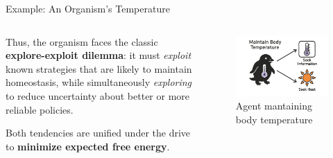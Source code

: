 \documentclass[aspectratio=1610, english]{beamer}
\begin{document}
\begin{frame}{Example: An Organism's Temperature}
    \begin{columns}[T]
        \begin{column}{0.5\textwidth}
            Thus, the organism faces the classic \textbf{explore-exploit dilemma}:  
            it must \emph{exploit} known strategies that are likely to maintain homeostasis, while simultaneously \emph{exploring} to reduce uncertainty about better or more reliable policies.
        
            \vspace{0.4cm}
        
            Both tendencies are unified under the drive to \textbf{minimize expected free energy}.
        \end{column}
        \begin{column}{0.5\textwidth}
            \begin{figure}
                \centering
                \includegraphics[width=1.0\linewidth]{img/active_inference_agent.png}
                \caption{Agent mantaining body temperature}
                \label{fig:active-inference-agent}
            \end{figure}
        \end{column}
    \end{columns}
\end{frame}
\end{document}
